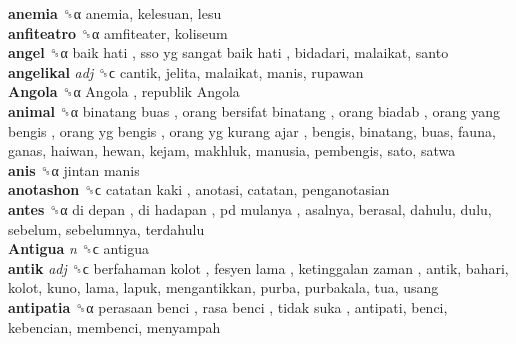\textbf{anemia} ␝α  anemia, kelesuan, lesu  \\
\textbf{anfiteatro} ␝α  amfiteater, koliseum  \\
\textbf{angel} ␝α   baik hati ,  sso yg sangat baik hati , bidadari, malaikat, santo  \\
\textbf{angelikal} \emph{adj}  ␝ϲ  cantik, jelita, malaikat, manis, rupawan  \\
\textbf{Angola} ␝α   Angola ,  republik Angola   \\
\textbf{animal} ␝α   binatang buas ,  orang bersifat binatang ,  orang biadab ,  orang yang bengis ,  orang yg bengis ,  orang yg kurang ajar , bengis, binatang, buas, fauna, ganas, haiwan, hewan, kejam, makhluk, manusia, pembengis, sato, satwa  \\
\textbf{anis} ␝α   jintan manis   \\
\textbf{anotashon} ␝ϲ   catatan kaki , anotasi, catatan, penganotasian  \\
\textbf{antes} ␝α   di depan ,  di hadapan ,  pd mulanya , asalnya, berasal, dahulu, dulu, sebelum, sebelumnya, terdahulu  \\
\textbf{Antigua} \emph{n}  ␝ϲ  antigua  \\
\textbf{antik} \emph{adj}  ␝ϲ   berfahaman kolot ,  fesyen lama ,  ketinggalan zaman , antik, bahari, kolot, kuno, lama, lapuk, mengantikkan, purba, purbakala, tua, usang  \\
\textbf{antipatia} ␝α   perasaan benci ,  rasa benci ,  tidak suka , antipati, benci, kebencian, membenci, menyampah  \\
